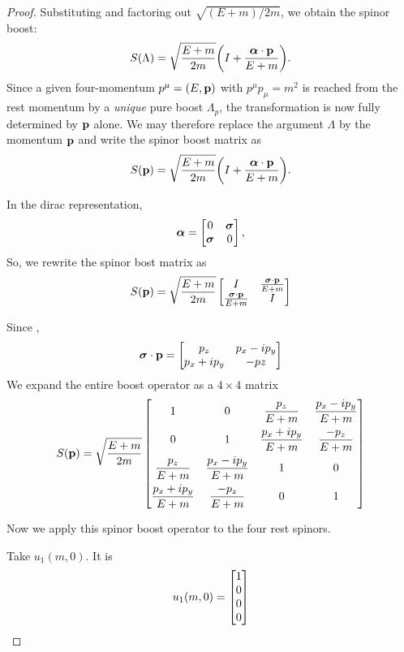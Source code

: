 \documentclass[12pt,a4paper]{article}
\begin{document}
\begin{solution_pset}
\begin{proof}
			Substituting and factoring out $\sqrt{(E+m)/2m}$, we obtain
			the spinor boost:
			\[
				S(\Lambda)
				=
				\sqrt{\frac{E+m}{2m}}
				\pqty{
					I + \frac{\vb*{\alpha}\cdot\vb{p}}{E+m}
				}.
			\]
			\newpage
			Since a given four-momentum $p^\mu = (E,\vb{p})$ with
			$p^\mu p_\mu = m^2$ is reached from the rest momentum by a
			\emph{unique} pure boost $\Lambda_p$, the transformation is now
			fully determined by $\vb{p}$ alone. We may therefore replace
			the argument $\Lambda$ by the momentum $\vb{p}$ and write the spinor boost matrix as
			\begin{equation}
				\label{eq:Sp}
				S(\vb{p})
				=
				\sqrt{\frac{E+m}{2m}}
				\pqty{
					I + \frac{\vb*{\alpha}\cdot\vb{p}}{E+m}
				}.
			\end{equation}

			In the dirac representation,
			\[
				\vb*{\alpha} = 
				\bmqty{
					0 & \vb*{\sigma}\\
					\vb*{\sigma}& 0
				}, 
			\]
			So, we rewrite the spinor bost matrix as
			\begin{equation}
				\label{eq:Sp2}
				S(\vb{p}) = 
				\sqrt{
					\frac{E+m}{2m} 
				}
				\bmqty{
					I & \frac{\vb*{\sigma}\cdot\vb{p}}{E+m} \\
					\frac{\vb*{\sigma}\cdot\vb{p}}{E+m} & I\\
				} 
			\end{equation}

			Since \cite{flores2026},
			\[
				\vb*{\sigma}\cdot \vb{p}
				=
				\bmqty{
					p_z & p_x - ip_y \\
					p_x + ip_y & -pz
				} 
			\]
			We expand the entire boost operator as a $4\times 4$ matrix
			\[
				S(\vb{p})
				=
				\sqrt{\frac{E+m}{2m}}
				\begin{bmatrix}
					1 & 0 & \dfrac{p_z}{E+m} & \dfrac{p_x - ip_y}{E+m} \\[8pt]
					0 & 1 & \dfrac{p_x + ip_y}{E+m} & \dfrac{-p_z}{E+m} \\[8pt]
					\dfrac{p_z}{E+m} & \dfrac{p_x - ip_y}{E+m} & 1 & 0 \\[8pt]
					\dfrac{p_x + ip_y}{E+m} & \dfrac{-p_z}{E+m} & 0 & 1
				\end{bmatrix}
			\]

			Now we apply this spinor boost operator to the four rest spinors.

			Take $u_1(m,0)$. It is
			\[
				u_1(m,0) = 
				\bmqty{
					1\\0\\0\\0
				} 
			\]


\end{proof}
\end{solution_pset}
\end{document}
